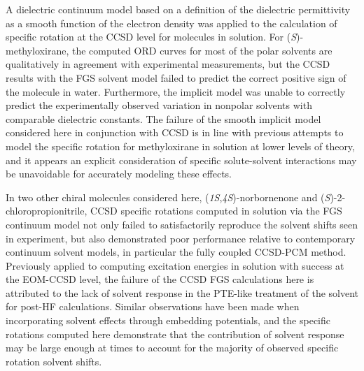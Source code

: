 A dielectric continuum model based on a definition of the dielectric
permittivity as a smooth function of the electron density was applied to the
calculation of specific rotation at the CCSD level for molecules in solution.
For (\emph{S})-methyloxirane, the computed ORD curves for most of the polar
solvents are qualitatively in agreement with experimental measurements,
but the CCSD results with the FGS solvent model failed to predict the
correct positive sign of the molecule in water. Furthermore, the implicit
model was unable to correctly predict the experimentally observed variation 
in nonpolar solvents with comparable dielectric constants. The failure
of the smooth implicit model considered here in conjunction with CCSD
is in line with previous attempts to model the specific
rotation for methyloxirane in solution at lower levels of theory, and it
appears an explicit consideration of specific solute-solvent
interactions may be unavoidable for accurately modeling these effects.

In two other chiral molecules considered here, (\emph{1S},\emph{4S})-norbornenone
and (\emph{S})-2-chloropropionitrile, CCSD specific rotations computed in
solution via the FGS continuum model not only failed to satisfactorily
reproduce the solvent shifts seen in experiment, but also demonstrated
poor performance relative to contemporary continuum solvent models, in particular the fully coupled
CCSD-PCM method. Previously applied to computing excitation energies in solution
with success at the EOM-CCSD level, the failure of the CCSD FGS calculations
here is attributed to the lack of solvent response in the PTE-like treatment
of the solvent for post-HF calculations. Similar observations have been
made when incorporating solvent effects through embedding potentials, and
the specific rotations computed here demonstrate that the contribution of solvent
response may be large enough at times to account for the majority of observed
specific rotation solvent shifts.

